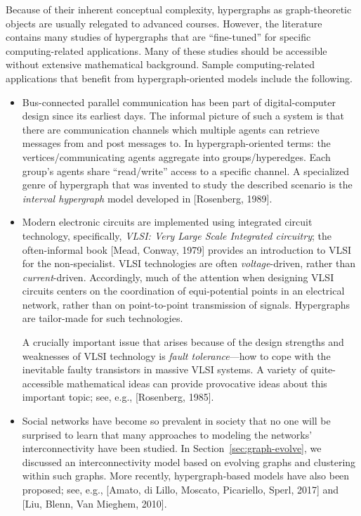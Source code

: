 Because of their inherent conceptual complexity, hypergraphs as graph-theoretic objects are usually relegated to advanced courses.  However, the literature contains many studies of hypergraphs that are ``fine-tuned'' for specific computing-related applications.  Many of these studies should be accessible without extensive mathematical background.  Sample  computing-related applications that benefit from hypergraph-oriented models include the following.
\begin{itemize}
\item
Bus-connected parallel communication has been part of digital-computer design since its earliest days.  The informal picture of such a system is that there are communication channels which multiple agents can retrieve messages from and post messages to.  In hypergraph-oriented terms: the vertices/communicating agents aggregate into groups/hyperedges.  Each group's agents share ``read/write'' access to a specific channel.  A specialized genre of hypergraph that was invented to study the described scenario is the {\it interval hypergraph} model developed in [Rosenberg, 1989].

\item
Modern electronic circuits are implemented using integrated circuit technology, specifically, {\em VLSI: Very Large Scale Integrated circuitry}; the often-informal book [Mead, Conway, 1979] provides an introduction to VLSI for the non-specialist.  VLSI technologies are often {\em voltage}-driven, rather than {\em current}-driven.  Accordingly, much of the attention when designing VLSI circuits centers on the coordination of equi-potential points in an electrical  network, rather than on point-to-point transmission of signals.  Hypergraphs are tailor-made for such technologies.

A crucially important issue that arises because of the design strengths and weaknesses of VLSI 
technology is {\it fault tolerance}---how to cope with the inevitable faulty transistors in massive VLSI systems.  A variety of quite-accessible mathematical ideas can provide provocative ideas about this important topic; see, e.g., [Rosenberg, 1985].

 

\item
Social networks have become so prevalent in society that no one will be surprised to learn that many approaches to modeling the networks' interconnectivity have been studied.  In
Section~\ref{sec:graph-evolve}, we discussed an interconnectivity model based on evolving graphs and clustering within such graphs.  More recently, hypergraph-based models have also been proposed; see, e.g., [Amato, di Lillo, Moscato, Picariello, Sperl, 2017] and [Liu, Blenn, Van Mieghem, 2010].
\end{itemize}

